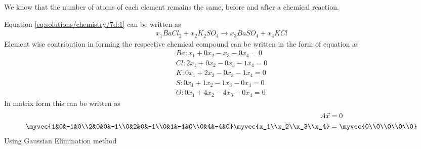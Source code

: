 We know that the number of atoms of each element remains the
same, before and after a chemical reaction.

Equation \eqref{eq:solutions/chemistry/7d:1} can be written as 
\begin{align}
x_1BaCl_2 + x_2K_2SO_4 \rightarrow x_3BaSO_4 + x_4KCl\label{eq:solutions/chemistry/7d:2}
\end{align}
Element wise contribution in forming the respective chemical compound can be written in the form of equation as  
\begin{align}
Ba : x_1 + 0x_2 - x_3 - 0x_4 = 0\\
Cl : 2x_1 + 0x_2 - 0x_3 - 1x_4 = 0\\
K  : 0x_1 + 2x_2 - 0x_3 - 1x_4 = 0\\
S  : 0x_1 + 1x_2 - 1x_3 - 0x_4 = 0\\
O  : 0x_1 + 4x_2 - 4x_3 - 0x_4 = 0
\end{align}
In matrix form this can be written as 
\begin{align}
A\vec{x}&=0\\
  \myvec{1&0&-1&0\\2&0&0&-1\\0&2&0&-1\\0&1&-1&0\\0&4&-4&0}\myvec{x_1\\x_2\\x_3\\x_4}&=\myvec{0\\0\\0\\0\\0}
\end{align}
Using Gaussian Elimination method 
